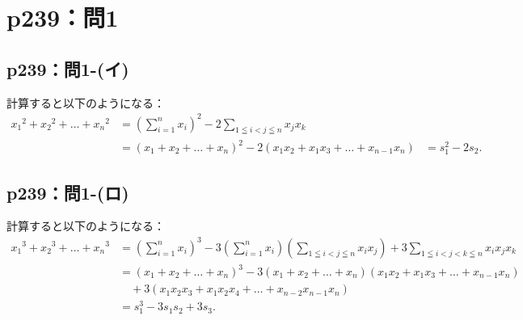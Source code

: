 \section*{p239：問1}

\subsection*{p239：問1-(イ)}


\begin{tanswer}
  計算すると以下のようになる：
  \begin{align*}
    {x_1}^2 + {x_2}^2+\dots+{x_n}^2 & = \left (\sum_{i=1}^{n} x_i \right )^2 - 2\sum_{1\leqq i < j \leqq n} x_j x_k \\
                                    & = (x_1+x_2+\dots+x_n)^2 - 2(x_1 x_2 + x_1 x_3 + \dots + x_{n-1} x_n)
                                    & = s_1^2 - 2s_2.
  \end{align*}
\end{tanswer}


\subsection*{p239：問1-(ロ)}
\begin{tanswer}
  計算すると以下のようになる：
  \begin{align*}
    {x_1}^3 + {x_2}^3+\dots+{x_n}^3 & = \left (\sum_{i=1}^{n} x_i \right )^3 - 3\left (\sum_{i=1}^{n} x_i \right ) \left(\sum_{1 \leqq i <j \leqq n} x_i x_j \right) + 3\sum_{1\leqq i < j < k \leqq n} x_i x_j x_k \\
                                    & = (x_1+x_2+\dots+x_n)^3 -3 (x_1+x_2+\dots+x_n)(x_1 x_2 +x_1 x_3 + \dots + x_{n-1} x_n)                                                                                        \\
                                    & \quad  +3(x_1 x_2 x_3 + x_1 x_2 x_4 + \dots + x_{n-2} x_{n-1} x_n)                                                                                                            \\
                                    & = s_1^3 -3s_1 s_2 + 3s_3.
  \end{align*}
\end{tanswer}

